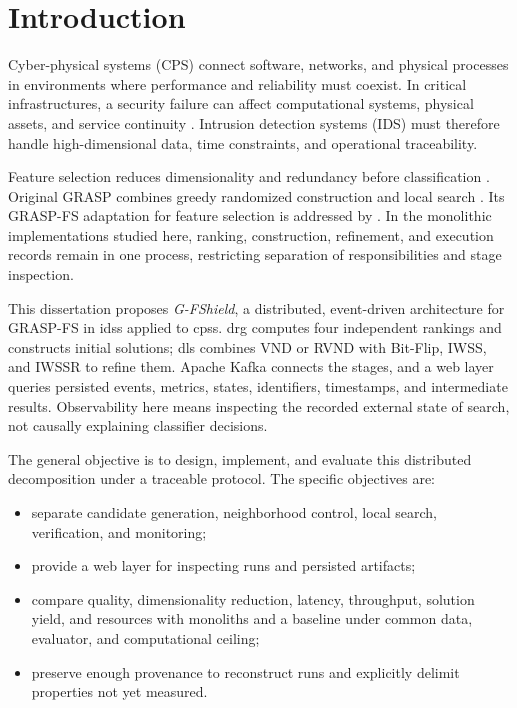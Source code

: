 \chapter{Introduction}
\label{chapter:introducao}

Cyber-physical systems (CPS) connect software, networks, and physical processes in environments where performance and reliability must coexist. In critical infrastructures, a security failure can affect computational systems, physical assets, and service continuity \cite{Cardenas2009,Mitchell2014,Alcaraz2019}. Intrusion detection systems (IDS) must therefore handle high-dimensional data, time constraints, and operational traceability.

Feature selection reduces dimensionality and redundancy before classification \cite{Hall1999,Saeys2007,guyon2003introduction}. Original GRASP combines greedy randomized construction and local search \cite{ResendeRibeiro2010}. Its GRASP-FS adaptation for feature selection is addressed by . In the monolithic implementations studied here, ranking, construction, refinement, and execution records remain in one process, restricting separation of responsibilities and stage inspection.

This dissertation proposes \textit{G-FShield}, a distributed, event-driven architecture for GRASP-FS in \acp{ids} applied to \acp{cps}. \ac{drg} computes four independent rankings and constructs initial solutions; \ac{dls} combines VND or RVND with Bit-Flip, IWSS, and IWSSR to refine them. Apache Kafka connects the stages, and a web layer queries persisted events, metrics, states, identifiers, timestamps, and intermediate results. Observability here means inspecting the recorded external state of search, not causally explaining classifier decisions.

The general objective is to design, implement, and evaluate this distributed decomposition under a traceable protocol. The specific objectives are:

\begin{itemize}
  \item separate candidate generation, neighborhood control, local search, verification, and monitoring;
  \item provide a web layer for inspecting runs and persisted artifacts;
  \item compare quality, dimensionality reduction, latency, throughput, solution yield, and resources with monoliths and a baseline under common data, evaluator, and computational ceiling;
  \item preserve enough provenance to reconstruct runs and explicitly delimit properties not yet measured.
\end{itemize}

